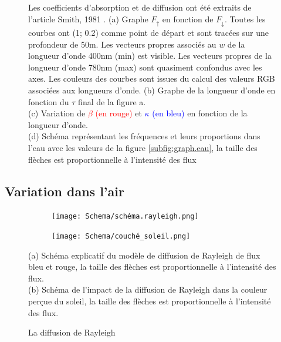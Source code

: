\documentclass[12pt]{article}
\begin{document}
\begin{figure}[H]
    \justifying \noindent
    Les coefficients d'absorption et de diffusion ont été extraits de l'article Smith, 1981 \cite{Smith:81}. \newline
    (a) Graphe $F_{\uparrow}$ en fonction de $F_{\downarrow}$. Toutes les courbes ont (1; 0.2) comme point de départ et sont tracées sur une profondeur de 50m. Les vecteurs propres associés au $w$ de la longueur d'onde 400nm (min) est visible. Les vecteurs propres de la longueur d'onde 780nm (max) sont quasiment confondus avec les axes. Les couleurs des courbes sont issues du calcul des valeurs RGB associées aux longueurs d'onde.\newline
    (b) Graphe de la longueur d'onde en fonction du $\tau$ final de la figure a. 
    \\(c) Variation de \textcolor{red}{$\beta$ (en rouge)} et \textcolor{blue}{$\kappa$ (en bleu)} en fonction de la longueur d'onde.
    \\(d) Schéma représentant les fréquences et leurs proportions dans l'eau avec les valeurs de la figure \ref{subfig:graph.eau}, la taille des flèches est proportionnelle à l'intensité des flux
    \label{fig:longeur_eau}
\end{figure}







\subsection{Variation dans l'air}
\begin{figure}[H]
    \centering
    \begin{subfigure}{0.49\textwidth}
        \texttt{[image: Schema/schéma.rayleigh.png]}
        \caption{}
        \label{subfig:Rayleigh}
    \end{subfigure}
    \begin{subfigure}{0.49\textwidth}
        \texttt{[image: Schema/couché\_soleil.png]}
        \caption{}
        \label{subfig:soleil}
    \end{subfigure}
    \caption{La diffusion de Rayleigh}
    \label{fig:atm}
    \justifying \noindent
     (a) Schéma explicatif du modèle de diffusion de Rayleigh de flux bleu et rouge, la taille des flèches est proportionnelle à l'intensité des flux.
    \\(b) Schéma de l'impact de la diffusion de Rayleigh dans la couleur perçue du soleil, la taille des flèches est proportionnelle à l'intensité des flux.
\end{figure}
\end{document}
